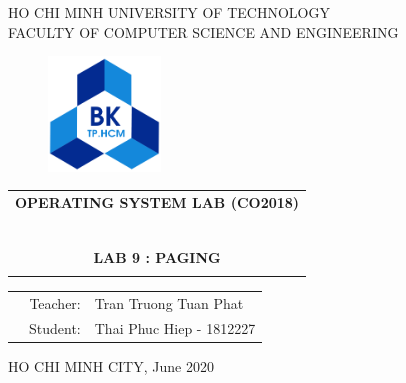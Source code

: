 \documentclass[a4paper]{article}
\begin{document}
\begin{titlepage}
\begin{center}
HO CHI MINH UNIVERSITY OF TECHNOLOGY \\
FACULTY OF COMPUTER SCIENCE AND ENGINEERING 
\end{center}

\vspace{1cm}

\begin{figure}[h!]
\begin{center}
\includegraphics[width=3cm]{hcmut.png}
\end{center}
\end{figure}

\vspace{1cm}


\begin{center}
\begin{tabular}{c}
\multicolumn{1}{c}{\textbf{{\Large OPERATING SYSTEM LAB (CO2018)}}}\\
~~\\
\hline
\\
\textbf{{\Huge LAB 9 : PAGING}}\\	
\\
\hline
\end{tabular}
\end{center}

\vspace{3cm}

\begin{table}[h]
\begin{tabular}{rrl}
\hspace{5 cm} & Teacher: & Tran Truong Tuan Phat\\
& Student: & Thai Phuc Hiep - 1812227 \\
\end{tabular}
\end{table}

\vspace{4.7cm}

\begin{center}
{\footnotesize HO CHI MINH CITY, June 2020}
\end{center}
\end{titlepage}
\end{document}
